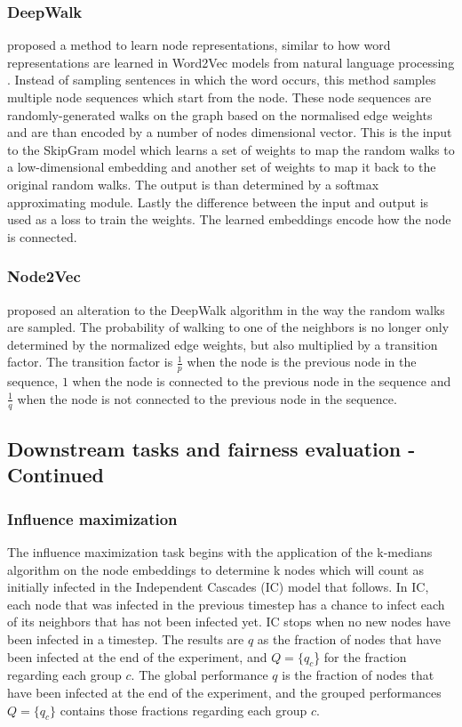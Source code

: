 \subsubsection*{DeepWalk} \citet{Perozzi2014} proposed a method to learn node representations, similar to how word representations are learned in Word2Vec models from natural language processing \cite{mikolov2013efficient}. Instead of sampling sentences in which the word occurs, this method samples multiple node sequences which start from the node. These node sequences are randomly-generated walks on the graph based on the normalised edge weights and are than encoded by a number of nodes dimensional vector. This is the input to the SkipGram model which learns a set of weights to map the random walks to a low-dimensional embedding and another set of weights to map it back to the original random walks. The output is than determined by a softmax approximating module. Lastly the difference between the input and output is used as a loss to train the weights. The learned embeddings encode how the node is connected.

\subsubsection*{Node2Vec} \citet{Grover2016} proposed an alteration to the DeepWalk algorithm in the way the random walks are sampled. The probability of walking to one of the neighbors is no longer only determined by the normalized edge weights, but also multiplied by a transition factor. The transition factor is $\frac{1}{p}$ when the node is the previous node in the sequence, $1$ when the node is connected to the previous node in the sequence and $\frac{1}{q}$ when the node is not connected to the previous node in the sequence.

\subsection{Downstream tasks and fairness evaluation - Continued}
\label{subsec:tasks-cont}

\subsubsection*{Influence maximization}
The influence maximization task begins with the application of the k-medians algorithm on the node embeddings to determine k nodes which will count as initially infected in the Independent Cascades (IC) model \cite{Kempe2015} that follows. 
In IC, each node that was infected in the previous timestep has a chance to infect each of its neighbors that has not been infected yet. IC stops when no new nodes have been infected in a timestep.
The results are $q$ as the fraction of nodes that have been infected at the end of the experiment, and $Q=\{q_c$\} for the fraction regarding each group $c$.
The global performance $q$ is the fraction of nodes that have been infected at the end of the experiment, and the grouped performances $Q=\{q_c\}$ contains those fractions regarding each group $c$.

